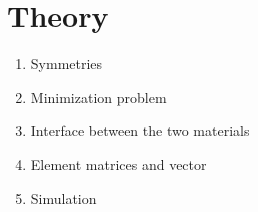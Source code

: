 \section{Theory}
\begin{enumerate}
\item Symmetries
\item Minimization problem
\item Interface between the two materials
\item Element matrices and vector
\item Simulation
\end{enumerate}